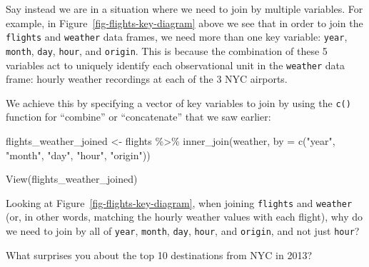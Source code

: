\documentclass[
  letterpaper,
  DIV=11,
  numbers=noendperiod]{scrreprt}
\newenvironment{Shaded}{\begin{snugshade}}{\end{snugshade}}
\newcommand{\AttributeTok}[1]{\textcolor[rgb]{0.40,0.45,0.13}{#1}}
\newcommand{\FunctionTok}[1]{\textcolor[rgb]{0.28,0.35,0.67}{#1}}
\newcommand{\NormalTok}[1]{\textcolor[rgb]{0.00,0.23,0.31}{#1}}
\newcommand{\OtherTok}[1]{\textcolor[rgb]{0.00,0.23,0.31}{#1}}
\newcommand{\SpecialCharTok}[1]{\textcolor[rgb]{0.37,0.37,0.37}{#1}}
\newcommand{\StringTok}[1]{\textcolor[rgb]{0.13,0.47,0.30}{#1}}
\theoremstyle{definition}
\theoremstyle{remark}
\begin{document}
Say instead we are in a situation where we need to join by multiple
variables. For example, in Figure~\ref{fig-flights-key-diagram} above we
see that in order to join the \texttt{flights} and \texttt{weather} data
frames, we need more than one key variable: \texttt{year},
\texttt{month}, \texttt{day}, \texttt{hour}, and \texttt{origin}. This
is because the combination of these 5 variables act to uniquely identify
each observational unit in the \texttt{weather} data frame: hourly
weather recordings at each of the 3 NYC airports.

We achieve this by specifying a vector of key variables to join by using
the \texttt{c()} function for ``combine'' or ``concatenate'' that we saw
earlier:

\begin{Shaded}
\begin{Highlighting}[]
\NormalTok{flights\_weather\_joined }\OtherTok{\textless{}{-}}\NormalTok{ flights }\SpecialCharTok{\%\textgreater{}\%}
  \FunctionTok{inner\_join}\NormalTok{(weather, }\AttributeTok{by =} \FunctionTok{c}\NormalTok{(}\StringTok{"year"}\NormalTok{, }\StringTok{"month"}\NormalTok{, }\StringTok{"day"}\NormalTok{, }\StringTok{"hour"}\NormalTok{, }\StringTok{"origin"}\NormalTok{))}

\FunctionTok{View}\NormalTok{(flights\_weather\_joined)}
\end{Highlighting}
\end{Shaded}

\begin{tcolorbox}[enhanced jigsaw, coltitle=black, toprule=.15mm, bottomtitle=1mm, breakable, leftrule=.75mm, title={{🎯} Learning Check 3.14}, opacitybacktitle=0.6, colback=white, rightrule=.15mm, opacityback=0, toptitle=1mm, colbacktitle=quarto-callout-tip-color!10!white, colframe=quarto-callout-tip-color-frame, titlerule=0mm, arc=.35mm, bottomrule=.15mm, left=2mm]
Looking at Figure~\ref{fig-flights-key-diagram}, when joining
\texttt{flights} and \texttt{weather} (or, in other words, matching the
hourly weather values with each flight), why do we need to join by all
of \texttt{year}, \texttt{month}, \texttt{day}, \texttt{hour}, and
\texttt{origin}, and not just \texttt{hour}?
\end{tcolorbox}

\begin{tcolorbox}[enhanced jigsaw, coltitle=black, toprule=.15mm, bottomtitle=1mm, breakable, leftrule=.75mm, title={{🎯} Learning Check 3.15}, opacitybacktitle=0.6, colback=white, rightrule=.15mm, opacityback=0, toptitle=1mm, colbacktitle=quarto-callout-tip-color!10!white, colframe=quarto-callout-tip-color-frame, titlerule=0mm, arc=.35mm, bottomrule=.15mm, left=2mm]
What surprises you about the top 10 destinations from NYC in 2013?
\end{tcolorbox}
\end{document}
